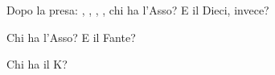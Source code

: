 \documentclass[../corsofiori.tex]{subfiles}
\begin{document}
\bigskip
\hspace{-.7cm}
\begin{minipage}{.45\textwidth}

    Dopo la presa: , , , , chi ha l'Asso? E il
    Dieci, invece?  
\end{minipage}\hfill\qquad
\begin{minipage}{.45\textwidth}

Chi ha l'Asso? E il Fante?
\end{minipage}\hfill
\bigskip

\hspace{-.7cm}
\begin{minipage}{.45\textwidth}

    Chi ha il K?
\end{minipage}\hfill
    
\end{document}
